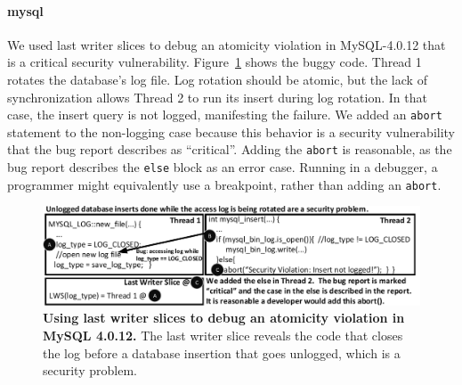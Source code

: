 \documentclass[preprint,10pt]{sigplanconf}
\begin{document}
%
%

\paragraph{mysql}

We used last writer slices to debug an atomicity violation in MySQL-4.0.12 that
is a critical security vulnerability.  Figure~\ref{fig:mysqllws} shows the
buggy code.  Thread 1 rotates the database's log file.  Log rotation should be
atomic, but the lack of synchronization allows Thread 2 to run its insert
during log rotation.  In that case, the insert query is not logged, manifesting
the failure.  We added an {\tt abort} statement to the non-logging case because
this behavior is a security vulnerability that the bug report describes as
``critical''.  Adding the {\tt abort} is reasonable, as the bug report
describes the {\tt else} block as an error case.  Running in a debugger, a
programmer might equivalently use a breakpoint, rather than adding an
{\tt abort}.


\begin{figure}[h]
\centering
\includegraphics[width=\columnwidth]{figs/MySQLDebug.pdf}
\caption{\label{fig:mysqllws}{\bf Using last writer slices to debug an
atomicity violation in MySQL 4.0.12.} The last writer slice reveals the code that closes the log before a database insertion that goes unlogged, which is a security problem.}
\end{figure}
\end{document}
